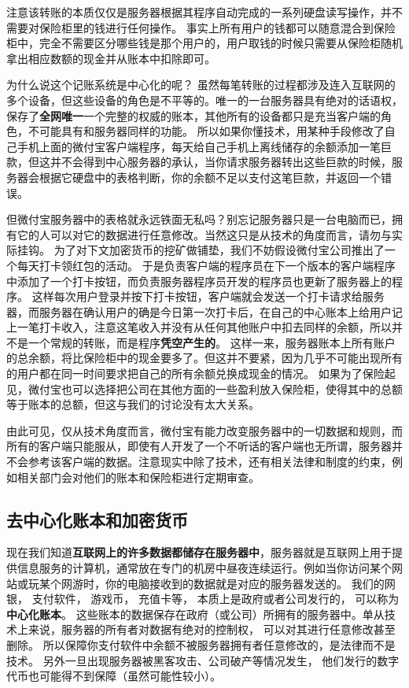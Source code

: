 注意该转账的本质仅仅是服务器根据其程序自动完成的一系列硬盘读写操作，并不需要对保险柜里的钱进行任何操作。 事实上所有用户的钱都可以随意混合到保险柜中，完全不需要区分哪些钱是那个用户的，用户取钱的时候只需要从保险柜随机拿出相应数额的现金并从账本中扣除即可。

为什么说这个记账系统是中心化的呢？ 虽然每笔转账的过程都涉及连入互联网的多个设备，但这些设备的角色是不平等的。唯一的一台服务器具有绝对的话语权，保存了\textbf{全网唯一}一个完整的权威的账本，其他所有的设备都只是充当客户端的角色，不可能具有和服务器同样的功能。 所以如果你懂技术，用某种手段修改了自己手机上面的微付宝客户端程序，每天给自己手机上离线储存的余额添加一笔巨款，但这并不会得到中心服务器的承认，当你请求服务器转出这些巨款的时候，服务器会根据它硬盘中的表格判断，你的余额不足以支付这笔巨款，并返回一个错误。

但微付宝服务器中的表格就永远铁面无私吗？别忘记服务器只是一台电脑而已，拥有它的人可以对它的数据进行任意修改。当然这只是从技术的角度而言，请勿与实际挂钩。 为了对下文加密货币的挖矿做铺垫，我们不妨假设微付宝公司推出了一个每天打卡领红包的活动。 于是负责客户端的程序员在下一个版本的客户端程序中添加了一个打卡按钮，而负责服务器程序员开发的程序员也更新了服务器上的程序。 这样每次用户登录并按下打卡按钮，客户端就会发送一个打卡请求给服务器，而服务器在确认用户的确是今日第一次打卡后，在自己的中心账本上给用户记上一笔打卡收入，注意这笔收入并没有从任何其他账户中扣去同样的余额，所以并不是一个常规的转账，而是程序\textbf{凭空产生的}。 这样一来，服务器账本上所有账户的总余额，将比保险柜中的现金要多了。但这并不要紧，因为几乎不可能出现所有的用户都在同一时间要求把自己的所有余额兑换成现金的情况。 如果为了保险起见，微付宝也可以选择把公司在其他方面的一些盈利放入保险柜，使得其中的总额等于账本的总额，但这与我们的讨论没有太大关系。

由此可见，仅从技术角度而言，微付宝有能力改变服务器中的一切数据和规则，而所有的客户端只能服从，即使有人开发了一个不听话的客户端也无所谓，服务器并不会参考该客户端的数据。注意现实中除了技术，还有相关法律和制度的约束，例如相关部门会对他们的账本和保险柜进行定期审查。

\subsection{去中心化账本和加密货币}
现在我们知道\textbf{互联网上的许多数据都储存在服务器中}，服务器就是互联网上用于提供信息服务的计算机，通常放在专门的机房中昼夜连续运行。例如当你访问某个网站或玩某个网游时，你的电脑接收到的数据就是对应的服务器发送的。 我们的网银， 支付软件， 游戏币， 充值卡等， 本质上是政府或者公司发行的， 可以称为\textbf{中心化账本}。 这些账本的数据保存在政府（或公司）所拥有的服务器中。单从技术上来说，服务器的所有者对数据有绝对的控制权， 可以对其进行任意修改甚至删除。 所以保障你支付软件中余额不被服务器拥有者任意修改的，是法律而不是技术。 另外一旦出现服务器被黑客攻击、公司破产等情况发生， 他们发行的数字代币也可能得不到保障（虽然可能性较小）。

